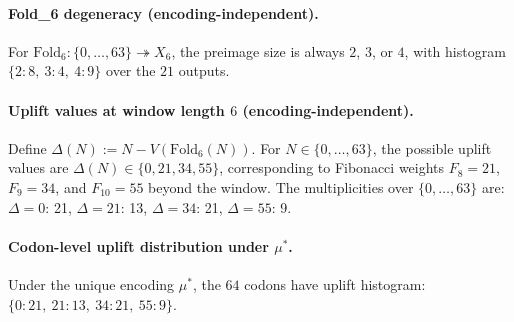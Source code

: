 \paragraph{Fold\_6 degeneracy (encoding-independent).}
For $\mathrm{Fold}_6:\{0,\dots,63\}\twoheadrightarrow X_6$, the preimage size is always $2$, $3$, or $4$, with histogram $\{2:8,\ 3:4,\ 4:9\}$ over the $21$ outputs.

\paragraph{Uplift values at window length $6$ (encoding-independent).}
Define $\Delta(N):=N-V(\mathrm{Fold}_6(N))$. For $N\in\{0,\dots,63\}$, the possible uplift values are $\Delta(N)\in\{0, 21, 34, 55\}$, corresponding to Fibonacci weights $F_8=21$, $F_9=34$, and $F_{10}=55$ beyond the window.
The multiplicities over $\{0,\dots,63\}$ are: $\Delta=0$: 21, $\Delta=21$: 13, $\Delta=34$: 21, $\Delta=55$: 9.

\paragraph{Codon-level uplift distribution under $\mu^\ast$.}
Under the unique encoding $\mu^\ast$, the $64$ codons have uplift histogram: $\{0:21,\ 21:13,\ 34:21,\ 55:9\}$.

